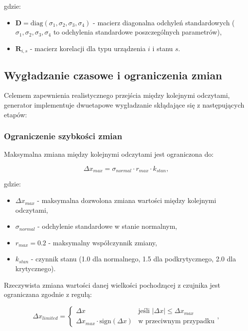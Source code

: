 gdzie:
\begin{itemize}
    \item $\mathbf{D} = \text{diag}(\sigma_1, \sigma_2, \sigma_3, \sigma_4)$ - macierz diagonalna odchyleń standardowych ($\sigma_1, \sigma_2, \sigma_3, \sigma_4$ to odchylenia standardowe poszczególnych parametrów),
    \item $\mathbf{R}_{i,s}$ - macierz korelacji dla typu urządzenia $i$ i stanu $s$.
\end{itemize}

\subsection{Wygładzanie czasowe i ograniczenia zmian}
\label{subsec:wygladzanie_czasowe}

Celemem zapewnienia realistycznego przejścia między kolejnymi odczytami, generator implementuje dwuetapowe wygładzanie skłądające się z następujących etapów:

\subsubsection{Ograniczenie szybkości zmian}

Maksymalna zmiana między kolejnymi odczytami jest ograniczona do:

\begin{equation}
\Delta x_{max} = \sigma_{normal} \cdot r_{max} \cdot k_{stan},
\end{equation}

gdzie:
\begin{itemize}
    \item $\Delta x_{max}$ - maksymalna dozwolona zmiana wartości między kolejnymi odczytami,
    \item $\sigma_{normal}$ - odchylenie standardowe w stanie normalnym,
    \item $r_{max} = 0.2$ - maksymalny współczynnik zmiany,
    \item $k_{stan}$ - czynnik stanu (1.0 dla normalnego, 1.5 dla podkrytycznego, 2.0 dla krytycznego).
\end{itemize}
    
\vspace{0.3em}

Rzeczywista zmiana wartości danej wielkości pochodzącej z czujnika jest ograniczana zgodnie z regułą:

\begin{equation}
\Delta x_{limited} = \begin{cases}
\Delta x & \text{jeśli } |\Delta x| \leq \Delta x_{max} \\
\Delta x_{max} \cdot \text{sign}(\Delta x) & \text{w przeciwnym przypadku}
\end{cases},
\end{equation}

